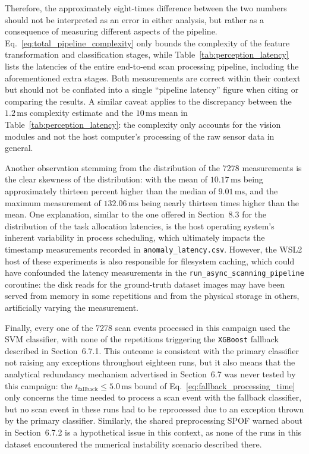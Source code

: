 Therefore, the approximately eight-times difference between the two numbers should not be interpreted as an error in either analysis, but rather as a consequence of measuring different aspects of the pipeline. Eq.~\eqref{eq:total_pipeline_complexity} only bounds the complexity of the feature transformation and classification stages, while Table~\ref{tab:perception_latency} lists the latencies of the entire end-to-end scan processing pipeline, including the aforementioned extra stages. Both measurements are correct within their context but should not be conflated into a single ``pipeline latency'' figure when citing or comparing the results. A similar caveat applies to the discrepancy between the $1.2\,\text{ms}$ complexity estimate and the $10\,\text{ms}$ mean in Table~\ref{tab:perception_latency}: the complexity only accounts for the vision modules and not the host computer's processing of the raw sensor data in general.

Another observation stemming from the distribution of the 7278 measurements is the clear skewness of the distribution: with the mean of $10.17\,\text{ms}$ being approximately thirteen percent higher than the median of $9.01\,\text{ms}$, and the maximum measurement of $132.06\,\text{ms}$ being nearly thirteen times higher than the mean. One explanation, similar to the one offered in Section~8.3 for the distribution of the task allocation latencies, is the host operating system's inherent variability in process scheduling, which ultimately impacts the timestamp measurements recorded in \texttt{anomaly\_latency.csv}. However, the WSL2 host of these experiments is also responsible for filesystem caching, which could have confounded the latency measurements in the \texttt{run\_async\_scanning\_pipeline} coroutine: the disk reads for the ground-truth dataset images may have been served from memory in some repetitions and from the physical storage in others, artificially varying the measurement.

Finally, every one of the 7278 scan events processed in this campaign used the SVM classifier, with none of the repetitions triggering the \texttt{XGBoost} fallback described in Section~6.7.1. This outcome is consistent with the primary classifier not raising any exceptions throughout eighteen runs, but it also means that the analytical redundancy mechanism advertised in Section~6.7 was never tested by this campaign: the $t_{\text{fallback}} \le 5.0\,\text{ms}$ bound of Eq.~\eqref{eq:fallback_processing_time} only concerns the time needed to process a scan event with the fallback classifier, but no scan event in these runs had to be reprocessed due to an exception thrown by the primary classifier. Similarly, the shared preprocessing SPOF warned about in Section~6.7.2 is a hypothetical issue in this context, as none of the runs in this dataset encountered the numerical instability scenario described there.

